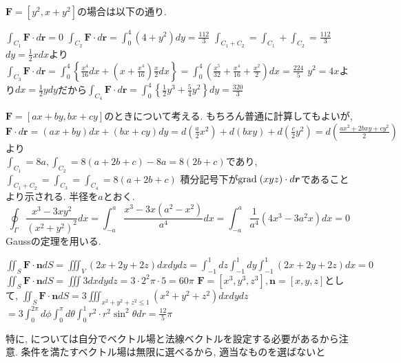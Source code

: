 \documentclass[a4j,dvipdfmx]{jsarticle}
\newcommand{\grad}{{\rm grad}\hspace{1mm}}
\begin{document}
        \begin{qparts}
            \qpart $\bm{F}=[y^2,x+y^2]$の場合は以下の通り.
            \begin{qlist}
                \qitem $\int_{C_1}\bm{F}\cdot d\bm{r}=0$
                \qitem $\int_{C_2}\bm{F}\cdot d\bm{r}=\int_{0}^{4}(4+y^2)dy=\frac{112}{3}$
                \qitem $\int_{C_1+C_2}=\int_{C_1}+\int_{C_2}=\frac{112}{3}$
                \qitem $dy=\frac{1}{2}xdx$より$\int_{C_3}\bm{F}\cdot d\bm{r}=\int_0^4\left\{\frac{x^4}{16}dx+\left(x+\frac{x^4}{16}\right)\frac{x}{2}dx\right\}=\int_0^4\left(\frac{x^5}{32}+\frac{x^4}{16}+\frac{x^2}{2}\right)dx=\frac{224}{5}$
                \qitem $y^2=4x$より$dx=\frac{1}{2}ydy$だから$\int_{C_4}\bm{F}\cdot d\bm{r}=\int_0^4\left\{\frac{1}{2}y^3+\frac{5}{4}y^2\right\}dy=\frac{320}{3}$
            \end{qlist}
            $\bm{F}=[ax+by,bx+cy]$のときについて考える. もちろん普通に計算してもよいが, $\bm{F}\cdot d\bm{r}=(ax+by)dx+(bx+cy)dy=d\left(\frac{a}{2}x^2\right)+d(bxy)+d\left(\frac{c}{2}y^2\right)=d\left(\frac{ax^2+2bxy+cy^2}{2}\right)$より\\
            $\int_{C_1} = 8a,\int_{C_2}=8(a+2b+c)-8a=8(2b+c)$であり, $\int_{C_1+C_2}=\int_{C_3}=\int_{C_4}=8(a+2b+c)$
        \qpart 積分記号下が$\grad (xyz)\cdot d\bm{r}$であることより示される.
        \qpart 半径を$a$とおく.
            \begin{equation*}
                \oint_\Gamma \frac{x^3-3xy^2}{(x^2+y^2)^2}dx=\int_{-a}^{a} \frac{x^3-3x(a^2-x^2)}{a^4}dx=\int_{-a}^{a}\frac{1}{a^4}(4x^3-3a^2x)dx=0
            \end{equation*}
        \qpart Gaussの定理を用いる.
            \begin{qlist}
                \qitem $\displaystyle \iint_S \bm{F}\cdot\bm{n}dS=\iiint_V (2x+2y+2z)dxdydz=\int_{-1}^{1}dz\int_{-1}^{1}dy\int_{-1}^{1}(2x+2y+2z)dx=0$
                \qitem $\displaystyle \iint_S\bm{F}\cdot\bm{n}dS=\iiint3dxdydz=3\cdot 2^2\pi\cdot 5 = 60\pi$
                \qitem $\bm{F}=[x^3,y^3,z^3],\bm{n}=[x,y,z]$として, $\displaystyle \iint_S \bm{F}\cdot\bm{n}dS=3\iiint_{x^2+y^2+z^2\leq 1}(x^2+y^2+z^2)dxdydz$\\
                $\displaystyle=3\int_{0}^{2\pi}d\phi\int_{0}^{\pi}d\theta\int_{0}^{1}r^2\cdot r^2\sin^2\theta dr=\frac{12}{5}\pi$\label{q:Gauss直接できないやつ}
            \end{qlist}
            特に, については自分でベクトル場と法線ベクトルを設定する必要があるから注意. 条件を満たすベクトル場は無限に選べるから, 適当なものを選ばないと

\end{qparts}
\end{document}
